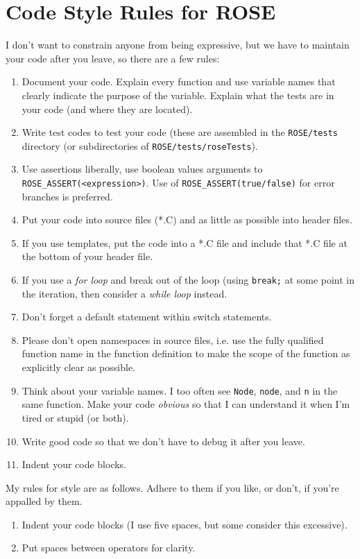 
\section{Code Style Rules for ROSE}%

   I don't want to constrain anyone from being expressive, but
we have to maintain your code after you leave, so there are a few rules:
\begin{enumerate}
   \item Document your code.
         Explain every function and use variable names that clearly indicate the purpose of
         the variable. Explain what the tests are in your code (and where they are located).
   \item Write test codes to test your code (these are assembled in the {\tt ROSE/tests}
         directory (or subdirectories of {\tt ROSE/tests/roseTests}).
   \item Use assertions liberally, use boolean values arguments to 
         {\tt ROSE\_ASSERT(<expression>)}. Use of {\tt ROSE\_ASSERT(true/false)} for
         error branches is preferred.
   \item Put your code into source files (*.C) and as little as possible into header files.
   \item If you use templates, put the code into a *.C file and include that *.C file
         at the bottom of your header file.
   \item If you use a {\em for loop} and break out of the loop (using {\tt break;} 
         at some point in the iteration, then consider a {\em while loop} instead.
   \item Don't forget a default statement within switch statements.
   \item Please don't open namespaces in source files, i.e. use the fully qualified
         function name in the function definition to make the scope of the function
         as explicitly clear as possible.
   \item Think about your variable names. I too often see {\tt Node}, {\tt node}, 
         and {\tt n} in the same function.  Make your code {\em obvious} so that I 
         can understand it when I'm tired or stupid (or both).
   \item Write good code so that we don't have to debug it after you leave.
   \item Indent your code blocks.
\end{enumerate}

My rules for style are as follows. Adhere to them if you like, or don't, if you're
    appalled by them.
\begin{enumerate}
   \item Indent your code blocks (I use five spaces, but some consider this excessive).
   \item Put spaces between operators for clarity.
\end{enumerate}

